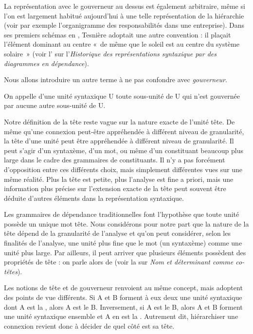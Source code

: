 La représentation avec le gouverneur au dessus est également arbitraire, même si l’on est largement habitué aujourd’hui à une telle représentation de la hiérarchie (voir par exemple l’organigramme des responsabilités dans une entreprise). Dans ses premiers schémas en \citeyear{tesniere1934comment}, Tesnière adoptait une autre convention : il plaçait l’élément dominant au centre «~de même que le soleil est au centre du système solaire~» (voir l’ sur l’\textit{Historique des représentations syntaxique par des diagrammes en dépendance}).

Nous allons introduire un autre terme à ne pas confondre avec \textit{gouverneur}.

{On appelle  d’une unité syntaxique U toute sous-unité de U qui n’est gouvernée par aucune autre sous-unité de U.}

Notre définition de la tête reste vague sur la nature exacte de l’unité tête. De même qu’une connexion peut-être appréhendée à différent niveau de granularité, la tête d’une unité peut être appréhendée à différent niveau de granularité. Il peut s’agir d’un syntaxème, d’un mot, ou même d’un constituant beaucoup plus large dans le cadre des grammaires de constituants. Il n’y a pas forcément d’opposition entre ces différents choix, mais simplement différentes vues sur une même réalité. Plus la tête est petite, plus l'analyse est fine a priori, mais une information plus précise sur l’extension exacte de la tête peut souvent être déduite d’autres éléments dans la représentation syntaxique.

Les grammaires de dépendance traditionnelles font l’hypothèse que toute uni\-té possède un unique mot tête. Nous considérons pour notre part que la nature de la tête dépend de la granularité de l’analyse et qu’on peut considérer, selon les finalités de l’analyse, une unité plus fine que le mot (un syntaxème) comme une unité plus large. Par ailleurs, il peut arriver que plusieurs éléments possèdent des propriétés de tête : on parle alors de  (voir la  sur \textit{Nom et déterminant comme co-têtes}).

Les notions de tête et de gouverneur renvoient au même concept, mais ado\-ptent des points de vue différents.
Si A et B forment à eux deux une unité syntaxique dont A est la , alors A est le  B. Inversement, si A est le  B, alors A et B forment une unité syntaxique ensemble et A en est la . Autrement dit, hiérarchiser une connexion revient donc à décider de quel côté est sa tête.%

